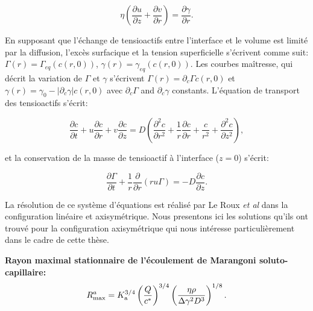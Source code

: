 \begin{equation}
  \eta\left(\frac{\partial u}{\partial z}+\frac{\partial v}{\partial r}\right)=\frac{\partial \gamma}{\partial r}\label{eq:Leroux4}.
\end{equation}

En supposant que l'échange de tensioactifs entre l'interface et le volume est limité par la diffusion, l'excès surfacique  et la tension superficielle s'écrivent comme suit: $\Gamma(r)=\Gamma_{eq}(c(r,0))$, $\gamma(r)=\gamma_{eq}(c(r,0))$. Les courbes maîtresse, qui décrit la variation de $\Gamma$ et $\gamma$ s'écrivent $\Gamma(r)=\partial_{c}\Gamma c(r,0)$ et $\gamma(r)=\gamma_0-|\partial_c\gamma|c(r,0)$ avec $\partial_c\Gamma$ and $\partial_c\gamma$ constants. L'équation de transport des tensioactifs s'écrit: 

\begin{equation}
  \frac{\partial c}{\partial t}+u\frac{\partial c}{\partial r}+v\frac{\partial c}{\partial z} = D\left(\frac{\partial^2 c}{\partial r^2}+\frac{1}{r}\frac{\partial c}{\partial r}+\frac{c}{r^2}+\frac{\partial^2 c}{\partial z^2}\right)\label{eq:Leroux5},
\end{equation}

et la conservation de la masse de tensioactif à l'interface ($z=0$) s'écrit: 

\begin{equation}
  \frac{\partial \Gamma}{\partial t}+\frac{1}{r}\frac{\partial}{\partial r}\left(ru\Gamma\right) = -D\frac{\partial c}{\partial z}.
\end{equation}

La résolution de ce système d'équations est réalisé par Le Roux \textit{et al} dans la configuration linéaire et axisymétrique. Nous presentons ici les solutions qu'ils ont trouvé pour la configuration axisymétrique qui nous intéresse particulièrement dans le cadre de cette thèse.
\begin{ombretheo}
  \begin{theo}
    \noindent\textbf{Rayon maximal stationnaire de l'écoulement de Marangoni soluto-capillaire:}\\
  \begin{equation}
    R_{\rm max}^{a}=K_{\rm a}^{3/4}\left(\frac{Q}{c^{*}}\right)^{3/4}\left(\frac{\eta\rho}{\Delta\gamma^2 D^3}\right)^{1/8}.
  \end{equation}
\end{theo}
\end{ombretheo}


